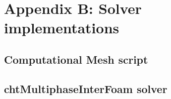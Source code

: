 
\chapter{Appendix B: Solver implementations} %

\label{AppendixB} 
\section{Computational Mesh script}

\section{chtMultiphaseInterFoam solver}












